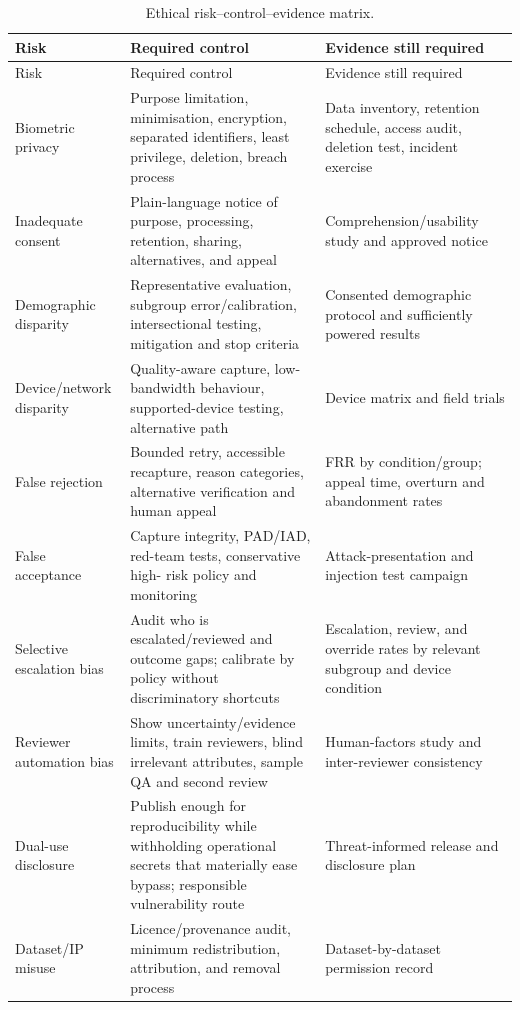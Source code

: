 \begin{longtable}{@{}p{31mm}p{52mm}p{50mm}@{}}
\caption{Ethical risk--control--evidence matrix.}\label{tab:ethics}\\
\toprule
Risk & Required control & Evidence still required \\
\midrule
\endfirsthead
\toprule
Risk & Required control & Evidence still required \\
\midrule
\endhead
Biometric privacy & Purpose limitation, minimisation, encryption, separated
identifiers, least privilege, deletion, breach process & Data inventory, retention
schedule, access audit, deletion test, incident exercise \\
Inadequate consent & Plain-language notice of purpose, processing, retention,
sharing, alternatives, and appeal & Comprehension/usability study and approved
notice \\
Demographic disparity & Representative evaluation, subgroup error/calibration,
intersectional testing, mitigation and stop criteria & Consented demographic
protocol and sufficiently powered results \\
Device/network disparity & Quality-aware capture, low-bandwidth behaviour,
supported-device testing, alternative path & Device matrix and field trials \\
False rejection & Bounded retry, accessible recapture, reason categories,
alternative verification and human appeal & FRR by condition/group; appeal time,
overturn and abandonment rates \\
False acceptance & Capture integrity, PAD/IAD, red-team tests, conservative high-
risk policy and monitoring & Attack-presentation and injection test campaign \\
Selective escalation bias & Audit who is escalated/reviewed and outcome gaps;
calibrate by policy without discriminatory shortcuts & Escalation, review, and
override rates by relevant subgroup and device condition \\
Reviewer automation bias & Show uncertainty/evidence limits, train reviewers,
blind irrelevant attributes, sample QA and second review & Human-factors study and
inter-reviewer consistency \\
Dual-use disclosure & Publish enough for reproducibility while withholding
operational secrets that materially ease bypass; responsible vulnerability route &
Threat-informed release and disclosure plan \\
Dataset/IP misuse & Licence/provenance audit, minimum redistribution, attribution,
and removal process & Dataset-by-dataset permission record \\
\bottomrule
\end{longtable}

